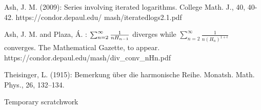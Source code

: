 \documentclass{article}
\begin{document}
\begin{thebibliography}{AsPl}
 Ash, J. M. (2009): Series involving iterated logarithms.
College Math. J., 40, 40-42. https://condor.depaul.edu/%
mash/iteratedlogs2.1.pdf

 Ash, J. M. and Plaza, \'{A}. : $\sum_{n=2}^{\infty }\frac{%
1}{nH_{n-1}}$ diverges while $\sum_{n=2}^{\infty }\frac{1}{n\left(
H_{n}\right) ^{1+\epsilon }}$ converges. The Mathematical Gazette, to
appear. https://condor.depaul.edu/mash/div\_conv\_nHn.pdf

 Theisinger, L. (1915): Bemerkung \"{u}ber die harmonische
Reihe. Monatsh. Math. Phys., 26, 132--134. 

\bibitem{} 
\end{thebibliography}

\bigskip 

\bigskip 

Temporary scratchwork
\end{document}
